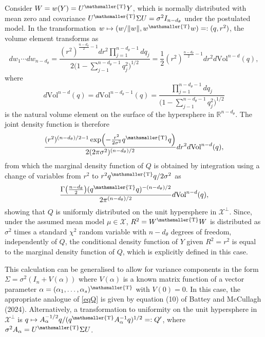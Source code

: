 \documentclass[10pt, reqno]{amsart}
\numberwithin{equation}{section}
\newcommand{\RR}{\mathbb{R}}
\newcommand{\T}{{\mathsmaller {\rm T}}}
\def\vhalf{\textstyle{\frac 1 2}}
\begin{document}
Consider $W=w(Y)=U^\T Y$, which is normally distributed with mean zero and covariance $U^\T \Sigma U=\sigma^2 I_{n-d_\theta}$ under the postulated model. In the transformation $w\mapsto (w/\|w\|,w^\T w) =: (q, r^2)$, the volume element transforms as
%
\begin{equation}\label{eqVol}
	dw_1\cdots dw_{n-d_\theta} = \frac{(r^2)^{\tfrac{n-d_\theta}{2}-1}dr^2 \textstyle{\prod_{j=1}^{n-d_\theta-1}}dq_{j}}{2 \bigl(1-\textstyle{\sum_{j-1}^{n-d_\theta-1}}q_{j}^2\bigr)^{1/2}} =  \vhalf (r^2)^{\tfrac{n-d_\theta}{2}-1}dr^2 d\text{Vol}^{n-d}(q),
\end{equation}
%
where 
\[
d\text{Vol}^{n-d}(q) = d\text{Vol}^{n-d_\theta - 1}(q) =\frac{\textstyle{\prod_{j=1}^{n-d_\theta-1}}dq_{j}}{\bigl(1-\textstyle{\sum_{j-1}^{n-d_\theta-1}}q_{j}^2\bigr)^{1/2}}
\]
is the natural volume element on the surface of the hypersphere in $\RR^{n-d_\theta}$. The joint density function is therefore
\[
\frac{(r^2)^{(n-d_\theta)/2 - 1}\exp\Bigl(-\frac{r^2}{2\sigma^2} q^\T q\Bigr)}{2 (2\pi\sigma^2)^{(n-d_\theta)/2}}dr^2 d\text{Vol}^{n-d}(q),
\]
from which the marginal density function of $Q$ is obtained by integration using a change of variables from $r^2$ to $r^2 q^\T q/2\sigma^2$ as 
%
\begin{equation}\label{eqQ}
	\frac{\Gamma\bigl(\frac{n-d_\theta}{2}\bigr)(q^\T  q)^{-(n-d_\theta)/2}}{2\pi^{(n-d_\theta)/2}}d\text{Vol}^{n-d}(q),
\end{equation}
%
showing that $Q$ is uniformly distributed on the unit hypersphere in $\mathcal{X}^\perp$. Since, under the assumed mean model $\mu \in \mathcal{X}$, $R^2=W^\T W$ is distributed as $\sigma^2$ times a standard $\chi^2$ random variable with $n-d_\theta$ degrees of freedom, independently of $Q$, the conditional density function of $Y$ given $R^2=r^2$ is equal to the marginal density function of $Q$, which is explicitly defined in this case.

This calculation can be generalised to allow for variance components in the form $\Sigma = \sigma^2(I_n + V(\alpha))$ where $V(\alpha)$ is a known matrix function of a vector parameter $\alpha=(\alpha_1, \ldots, \alpha_s)^\T$ with $V(0) = 0$. In this case, the appropriate analogue of \eqref{eqQ} is given by equation (10) of Battey and McCullagh (2024). Alternatively, a transformation to uniformity on the unit hypersphere in $\mathcal{X}^\perp$ is $q\mapsto A_\alpha^{-1/2}q/(q^\T A_{\alpha}^{-1} q)^{1/2}=:Q'$, where $\sigma^2 A_\alpha=U^\T \Sigma U$. %
\end{document}
